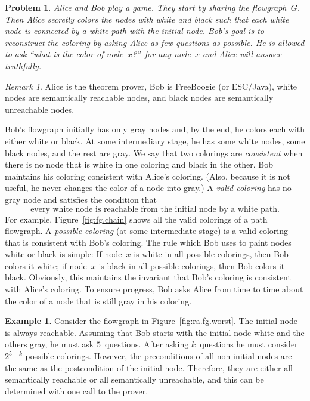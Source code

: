 \documentclass[a4paper]{article}
\newcommand{\escjava}{ESC\slash Java\xspace}
\theoremstyle{slanted}
\newtheorem{problem}{Problem}
\theoremstyle{definition}
\newtheorem{example}{Example}
\theoremstyle{remark}
\newtheorem{remark}{Remark}
\begin{document}
\begin{problem}
Alice and Bob play a game. They start by sharing the
flowgraph~$G$. Then Alice secretly colors the nodes with white
and black such that each white node is connected by a white path
with the initial node. Bob's goal is to reconstruct the coloring
by asking Alice as few questions as possible. He is allowed to
ask ``what is the color of node~$x$?''\ for any node~$x$ and
Alice will answer truthfully.
\label{pb:ra.abstract}
\end{problem}

\begin{remark}
Alice is the theorem prover, Bob is FreeBoogie (or \escjava),
white nodes are semantically reachable nodes, and black nodes are
semantically unreachable nodes.
\end{remark}

Bob's flowgraph initially has only gray nodes and, by the end,
he colors each with either white or black. At some intermediary
stage, he has some white nodes, some black nodes, and the rest
are gray. We say that two colorings are \emph{consistent} when
there is no node that is white in one coloring and black in
the other. Bob maintains his coloring consistent with Alice's
coloring. (Also, because it is not useful, he never changes the
color of a node into gray.) A \emph{valid coloring} has no gray
node and satisfies the condition that
\begin{equation}
\label{eq:ra.fg-cond}
\text{every white node is reachable from the initial node 
by a white path.}
\end{equation}
For example, Figure~\ref{fig:fg.chain} shows all the valid
colorings of a path flowgraph. A \emph{possible coloring} (at
some intermediate stage) is a valid coloring that is consistent
with Bob's coloring. The rule which Bob uses to paint nodes
white or black is simple: If node~$x$ is white in all possible
colorings, then Bob colors it white; if node~$x$ is black in
all possible colorings, then Bob colors it black. Obviously,
this maintains the invariant that Bob's coloring is consistent
with Alice's coloring. To ensure progress, Bob asks Alice from
time to time about the color of a node that is still gray in his
coloring.

\begin{example}
Consider the flowgraph in Figure~\ref{fig:ra.fg.worst}. The
initial node is always reachable. Assuming that Bob starts
with the initial node white and the others gray, he must ask
$5$~questions. After asking $k$~questions he must consider
$2^{5-k}$ possible colorings. However, the preconditions of
all non-initial nodes are the same as the postcondition of
the initial node. Therefore, they are either all semantically
reachable or all semantically unreachable, and this can be
determined with one call to the prover.
\label{ex:ra.bad-model}
\end{example}
\end{document}
